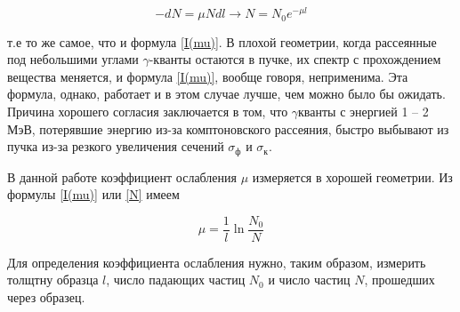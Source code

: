 		\begin{equation}\label{N}
		-dN = \mu N dl \rightarrow N = N_0 e^{-\mu l}
		\end{equation}
		
		т.е то же самое, что и формула \eqref{I(mu)}. В плохой геометрии, когда рассеянные под небольшими углами
		$\gamma$-кванты остаются в пучке, их спектр с прохождением вещества меняется, и формула \eqref{I(mu)}, вообще говоря, неприменима. Эта формула, однако, работает и в этом случае лучше, чем можно было бы ожидать. Причина хорошего согласия заключается в том, что $\gamma$кванты с энергией 1 -- 2 МэВ, потерявшие энергию из-за комптоновского рассеяния,
		быстро выбывают из пучка из-за резкого увеличения сечений $ \sigma_ф $ и $ \sigma_к $.
		
		В данной работе коэффициент ослабления $ \mu $ измеряется в хорошей
		геометрии. Из формулы \eqref{I(mu)} или \eqref{N} имеем
		
		\begin{equation}\label{mu}
		\mu = \dfrac{1}{l} \ln{\dfrac{N_0}{N}}
		\end{equation}

	Для определения коэффициента ослабления нужно, таким образом, измерить толщтну образца $l$, число падающих частиц $N_0$ и число частиц $N$, прошедших через образец.
	